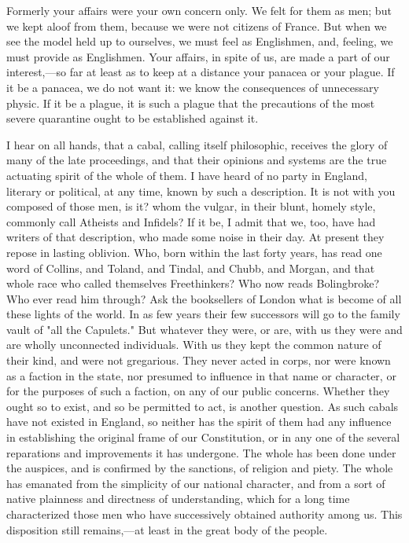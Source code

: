 Formerly your affairs were your own concern only. We felt for them as men; but we kept aloof from them, because we were not citizens of France. But when we see the model held up to ourselves, we must feel as Englishmen, and, feeling, we must provide as Englishmen. Your affairs, in spite of us, are made a part of our interest,—so far at least as to keep at a distance your panacea or your plague. If it be a panacea, we do not want it: we know the consequences of unnecessary physic. If it be a plague, it is such a plague that the precautions of the most severe quarantine ought to be established against it.

I hear on all hands, that a cabal, calling itself philosophic, receives the glory of many of the late proceedings, and that their opinions and systems are the true actuating spirit of the whole of them. I have heard of no party in England, literary or political, at any time, known by such a description. It is not with you composed of those men, is it? whom the vulgar, in their blunt, homely style, commonly call Atheists and Infidels? If it be, I admit that we, too, have had writers of that description, who made some noise in their day. At present they repose in lasting oblivion. Who, born within the last forty years, has read one word of Collins, and Toland, and Tindal, and Chubb, and Morgan, and that whole race who called themselves Freethinkers? Who now reads Bolingbroke? Who ever read him through? Ask the booksellers of London what is become of all these lights of the world. In as few years their few successors will go to the family vault of "all the Capulets." But whatever they were, or are, with us they were and are wholly unconnected individuals. With us they kept the common nature of their kind, and were not gregarious. They never acted in corps, nor were known as a faction in the state, nor presumed to influence in that name or character, or for the purposes of such a faction, on any of our public concerns. Whether they ought so to exist, and so be permitted to act, is another question. As such cabals have not existed in England, so neither has the spirit of them had any influence in establishing the original frame of our Constitution, or in any one of the several reparations and improvements it has undergone. The whole has been done under the auspices, and is confirmed by the sanctions, of religion and piety. The whole has emanated from the simplicity of our national character, and from a sort of native plainness and directness of understanding, which for a long time characterized those men who have successively obtained authority among us. This disposition still remains,—at least in the great body of the people.

